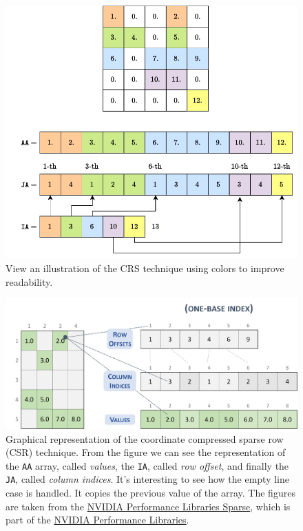 \begin{itemize}
\begin{enumerate}
\begin{equation*}
\begin{array}{rcl}
			\end{array}
		\end{equation*}
	\end{enumerate}
	\newpage
	\begin{figure}[!htp]
		\centering
		\includegraphics[width=\textwidth]{img/crs.pdf}
		\caption{View an illustration of the CRS technique using colors to improve readability.}
	\end{figure}
	\begin{figure}[!htp]
		\centering
		\includegraphics[width=.9\textwidth]{img/csr_one_base.png}
		\caption{Graphical representation of the coordinate compressed sparse row (CSR) technique. From the figure we can see the representation of the \texttt{AA} array, called \emph{values}, the \texttt{IA}, called \emph{row offset}, and finally the \texttt{JA}, called \emph{column indices}.
		It's interesting to see how the empty line case is handled. It copies the previous value of the array.
		The figures are taken from the \href{https://docs.nvidia.com/nvpl/_static/sparse/storage_format/sparse_matrix.html}{NVIDIA Performance Libraries Sparse}, which is part of the \href{https://developer.nvidia.com/nvpl}{NVIDIA Performance Libraries}.}
	\end{figure}
\end{itemize}